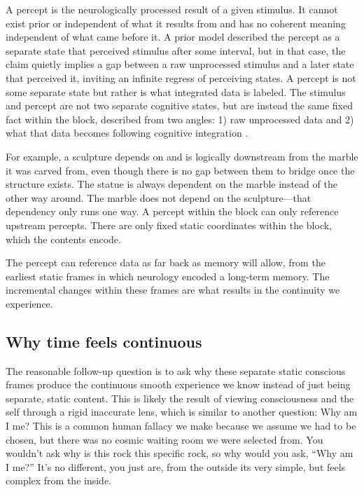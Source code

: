 \documentclass[11pt,a4paper]{article}
\begin{document}
A percept is the neurologically processed result of a given stimulus. It cannot exist prior or independent of what it results from and has no coherent meaning independent of what came before it. A prior model described the percept as a separate state that perceived stimulus after some interval, but in that case, the claim quietly implies a gap between a raw unprocessed stimulus and a later state that perceived it, inviting an infinite regress of perceiving states. A percept is not some separate state but rather is what integrated data is labeled. The stimulus and percept are not two separate cognitive states, but are instead the same fixed fact within the block, described from two angles: 1) raw unprocessed data and 2) what that data becomes following cognitive integration \citep{jepson1993percept}.

For example, a sculpture depends on and is logically downstream from the marble it was carved from, even though there is no gap between them to bridge once the structure exists. The statue is always dependent on the marble instead of the other way around. The marble does not depend on the sculpture—that dependency only runs one way. A percept within the block can only reference upstream percepts. There are only fixed static coordinates within the block, which the contents encode.

The percept can reference data as far back as memory will allow, from the earliest static frames in which neurology encoded a long-term memory. The incremental changes within these frames are what results in the continuity we experience.

\subsection{Why time feels continuous}

The reasonable follow-up question is to ask why these separate static conscious frames produce the continuous smooth experience we know instead of just being separate, static content. This is likely the result of viewing consciousness and the self through a rigid inaccurate lens, which is similar to another question: Why am I me? This is a common human fallacy we make because we assume we had to be chosen, but there was no cosmic waiting room we were selected from. You wouldn't ask why is this rock this specific rock, so why would you ask, “Why am I me?” It’s no different, you just are, from the outside its very simple, but feels complex from the inside.
\end{document}
